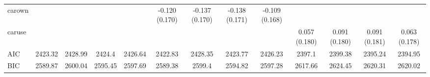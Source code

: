 \begin{table}[!htbp]
\begin{tabular}{lcccccccccccc}
carown &  &  &  &  & -0.120 (0.170) & -0.137 (0.170) & -0.138 (0.171) & -0.109 (0.168) &  &  &  &  \\
caruse &  &  &  &  &  &  &  &  & 0.057 (0.180) & 0.091 (0.180) & 0.091 (0.181) & 0.063 (0.178) \\
AIC & 2423.32 & 2428.99 & 2424.4 & 2426.64 & 2422.83 & 2428.35 & 2423.77 & 2426.23 & 2397.1 & 2399.38 & 2395.24 & 2394.95 \\
BIC & 2589.87 & 2600.04 & 2595.45 & 2597.69 & 2589.38 & 2599.4 & 2594.82 & 2597.28 & 2617.66 & 2624.45 & 2620.31 & 2620.02 \\
\hline
\end{tabular}
\end{table}
